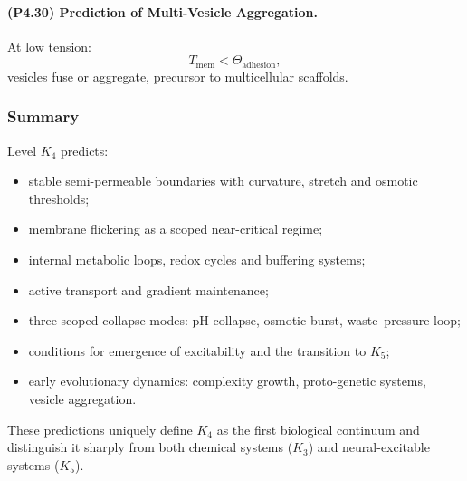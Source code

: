 \paragraph{(P4.30) Prediction of Multi-Vesicle Aggregation.}
At low tension:
\[
T_{\mathrm{mem}} < \Theta_{\mathrm{adhesion}},
\]
vesicles fuse or aggregate, precursor to multicellular scaffolds.

\subsubsection{Summary}

Level $K_4$ predicts:
\begin{itemize}
    \item stable semi-permeable boundaries with curvature, stretch and osmotic thresholds;
    \item membrane flickering as a scoped near-critical regime;
    \item internal metabolic loops, redox cycles and buffering systems;
    \item active transport and gradient maintenance;
    \item three scoped collapse modes: pH-collapse, osmotic burst, waste–pressure loop;
    \item conditions for emergence of excitability and the transition to $K_5$;
    \item early evolutionary dynamics: complexity growth, proto-genetic systems, vesicle aggregation.
\end{itemize}

These predictions uniquely define $K_4$ as the first biological continuum and
distinguish it sharply from both chemical systems ($K_3$) and neural-excitable
systems ($K_5$).
